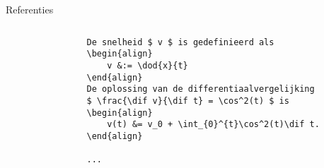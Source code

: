 \begin{frame}[fragile,t]{Referenties}
    \tiny
    \begin{columns}[t]
        \begin{column}{0.5\textwidth}%
            \begin{verbatim}
                De snelheid $ v $ is gedefinieerd als
                \begin{align}
                    v &:= \dod{x}{t}
                \end{align}
                De oplossing van de differentiaalvergelijking
                $ \frac{\dif v}{\dif t} = \cos^2(t) $ is
                \begin{align}
                    v(t) &= v_0 + \int_{0}^{t}\cos^2(t)\dif t.
                \end{align}

                ...


\end{verbatim}
\end{column}
\end{columns}
\end{frame}
